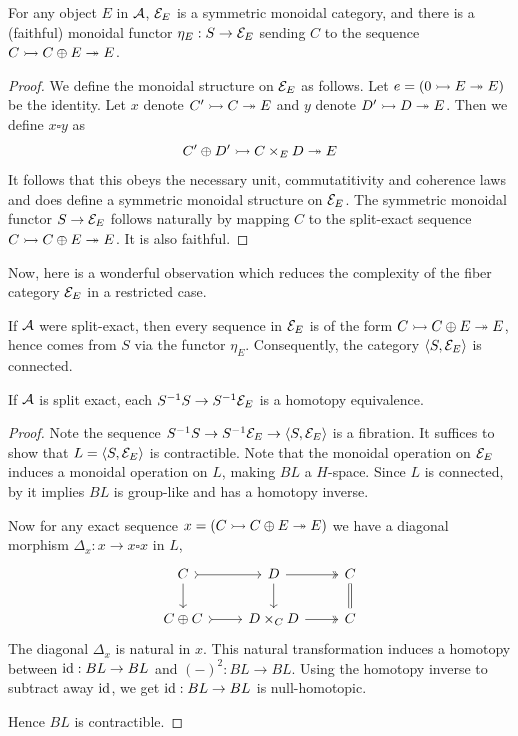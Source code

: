 \begin{proposition}
For any object $E$ in $\mathcal{A}$, $\mathcal{E}_E$ is a symmetric monoidal category,
and there is a (faithful) monoidal functor $\eta_E : S \to \mathcal{E}_E$ sending $C$ to the
sequence $C \rightarrowtail C\oplus E \twoheadrightarrow E$.
\end{proposition}
\begin{proof}
We define the monoidal structure on $\mathcal{E}_E$ as follows.
Let $e = (0 \rightarrowtail E \twoheadrightarrow E)$ be the identity.
Let $x$ denote $C' \rightarrowtail C \twoheadrightarrow E$ and $y$ denote $D' \rightarrowtail D \twoheadrightarrow E$.
Then we define $x \square y$ as
\[
C' \oplus D' \rightarrowtail C \times_E D \twoheadrightarrow E
\]
It follows that this obeys the necessary unit, commutatitivity and coherence laws
and does define a symmetric monoidal structure on $\mathcal{E}_E$.
The symmetric monoidal functor $S \to \mathcal{E}_E$ follows naturally by mapping
$C$ to the split-exact sequence $C \rightarrowtail C \oplus E \twoheadrightarrow E$.
It is also faithful.
\end{proof}

Now, here is a wonderful observation which reduces the complexity of the fiber category $\mathcal{E}_E$ in a restricted case.
\begin{remark}
If $\mathcal{A}$ were split-exact, then every sequence in $\mathcal{E}_E$ is of the form $C \rightarrowtail C \oplus E \twoheadrightarrow E$,
hence comes from $S$ via the functor $\eta_E$.
Consequently, the category $\langle S, \mathcal{E}_E \rangle$ is connected.
\end{remark}

\begin{proposition}
If $\mathcal{A}$ is split exact, each $S^{-1}S \to S^{-1}\mathcal{E}_E$ is a homotopy equivalence.
\end{proposition}
\begin{proof}
Note the sequence $S^{-1}S \to S^{-1}\mathcal{E}_E \to \langle S, \mathcal{E}_E \rangle$ is a fibration.
It suffices to show that $L = \langle S, \mathcal{E}_E \rangle$ is contractible.
Note that the monoidal operation on $\mathcal{E}_E$ induces a monoidal operation on $L$,
making $BL$ a $H$-space. Since $L$ is connected, by \cite{Whitehead} it implies $BL$ is group-like
and has a homotopy inverse.

Now for any exact sequence $x = (C \rightarrowtail C \oplus E \twoheadrightarrow E)$ we have a diagonal morphism
$\Delta_x : x \to x \square x$ in $L$,
\[
\begin{tikzcd}
C     \arrow[r,tail] \arrow[d] & D       \arrow[r,two heads] \arrow[d] & C \arrow[d, equal] \\
C \oplus C \arrow[r,tail]           & D \times_C D \arrow[r,two heads]           & C
\end{tikzcd}
\]
The diagonal $\Delta_x$ is natural in $x$.
This natural transformation induces a homotopy between $\operatorname*{id} : BL \to BL$ and $(-)^2 : BL \to BL$.
Using the homotopy inverse to subtract away $\operatorname*{id}$, we get $\operatorname*{id} : BL \to BL$ is null-homotopic.

Hence $BL$ is contractible.
\end{proof}

